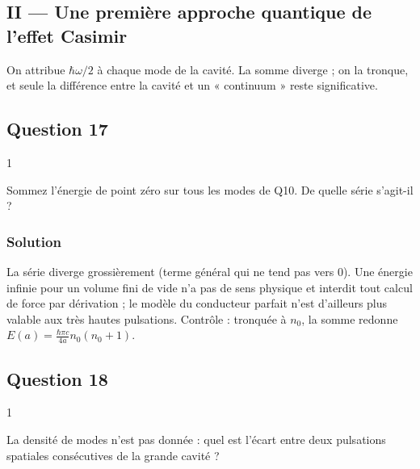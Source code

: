 \documentclass[11pt,a4paper]{article}
\newcommand{\equationajustee}[1]{%
  \sbox{\boiteequation}{$\displaystyle #1$}%
  \ifdim\wd\boiteequation>\linewidth
    \[\resizebox{\linewidth}{!}{\usebox{\boiteequation}}\]%
  \else
    \[#1\]%
  \fi}
\begin{document}
\hypertarget{ii-une-premiuxe8re-approche-quantique-de-leffet-casimir}{%
\subsection{II --- Une première approche quantique de l'effet Casimir}\label{ii-une-premiuxe8re-approche-quantique-de-leffet-casimir}}

On attribue \(\hbar\omega/2\) à chaque mode de la cavité. La somme diverge ; on la tronque, et seule la différence entre la cavité et un « continuum » reste significative.

\hypertarget{question-17}{%
\subsection{Question 17}\label{question-17}}

\begin{indication}{1}

Sommez l'énergie de point zéro sur tous les modes de Q10. De quelle série s'agit-il ?

\end{indication}

\hypertarget{solution-16}{%
\subsubsection{Solution}\label{solution-16}}

\equationajustee{\begin{aligned}
E&=\sum_{n=1}^{+\infty}\frac{\hbar k_{z,n}c}{2}\\
&=\frac{\hbar\pi c}{2a}\sum_{n=1}^{+\infty}n\\
&=\boxed{+\infty}
\end{aligned}}

La série diverge grossièrement (terme général qui ne tend pas vers 0). Une énergie infinie pour un volume fini de vide n'a pas de sens physique et interdit tout calcul de force par dérivation ; le modèle du conducteur parfait n'est d'ailleurs plus valable aux très hautes pulsations. Contrôle : tronquée à \(n_0\), la somme redonne \(E(a)=\frac{\hbar\pi c}{4a}n_0(n_0+1)\).

\hypertarget{question-18}{%
\subsection{Question 18}\label{question-18}}

\begin{indication}{1}

La densité de modes n'est pas donnée : quel est l'écart entre deux pulsations spatiales consécutives de la grande cavité ?

\end{indication}
\end{document}
